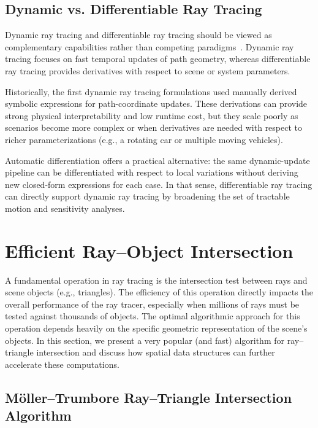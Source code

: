 \subsection{Dynamic vs. Differentiable Ray Tracing}

Dynamic ray tracing and differentiable ray tracing should be viewed as complementary capabilities rather than competing paradigms~. Dynamic ray tracing focuses on fast temporal updates of path geometry, whereas differentiable ray tracing provides derivatives with respect to scene or system parameters.

Historically, the first dynamic ray tracing formulations used manually derived symbolic expressions for path-coordinate updates. These derivations can provide strong physical interpretability and low runtime cost, but they scale poorly as scenarios become more complex or when derivatives are needed with respect to richer parameterizations (e.g., a rotating car or multiple moving vehicles).

Automatic differentiation offers a practical alternative: the same dynamic-update pipeline can be differentiated with respect to local variations without deriving new closed-form expressions for each case. In that sense, differentiable ray tracing can directly support dynamic ray tracing by broadening the set of tractable motion and sensitivity analyses.

\section{Efficient Ray--Object Intersection}

A fundamental operation in ray tracing is the intersection test between rays and scene objects (e.g., triangles). The efficiency of this operation directly impacts the overall performance of the ray tracer, especially when millions of rays must be tested against thousands of objects. The optimal algorithmic approach for this operation depends heavily on the specific geometric representation of the scene's objects. In this section, we present a very popular (and fast) algorithm for ray--triangle intersection and discuss how spatial data structures can further accelerate these computations.

\subsection{Möller--Trumbore Ray--Triangle Intersection Algorithm}

